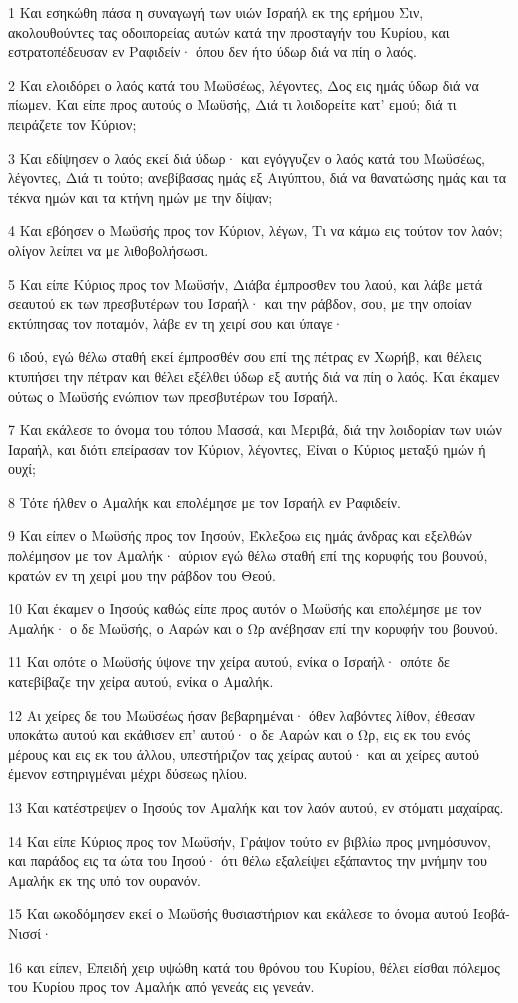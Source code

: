 \par 1 Και εσηκώθη πάσα η συναγωγή των υιών Ισραήλ εκ της ερήμου Σιν, ακολουθούντες τας οδοιπορείας αυτών κατά την προσταγήν του Κυρίου, και εστρατοπέδευσαν εν Ραφιδείν· όπου δεν ήτο ύδωρ διά να πίη ο λαός.
\par 2 Και ελοιδόρει ο λαός κατά του Μωϋσέως, λέγοντες, Δος εις ημάς ύδωρ διά να πίωμεν. Και είπε προς αυτούς ο Μωϋσής, Διά τι λοιδορείτε κατ' εμού; διά τι πειράζετε τον Κύριον;
\par 3 Και εδίψησεν ο λαός εκεί διά ύδωρ· και εγόγγυζεν ο λαός κατά του Μωϋσέως, λέγοντες, Διά τι τούτο; ανεβίβασας ημάς εξ Αιγύπτου, διά να θανατώσης ημάς και τα τέκνα ημών και τα κτήνη ημών με την δίψαν;
\par 4 Και εβόησεν ο Μωϋσής προς τον Κύριον, λέγων, Τι να κάμω εις τούτον τον λαόν; ολίγον λείπει να με λιθοβολήσωσι.
\par 5 Και είπε Κύριος προς τον Μωϋσήν, Διάβα έμπροσθεν του λαού, και λάβε μετά σεαυτού εκ των πρεσβυτέρων του Ισραήλ· και την ράβδον, σου, με την οποίαν εκτύπησας τον ποταμόν, λάβε εν τη χειρί σου και ύπαγε·
\par 6 ιδού, εγώ θέλω σταθή εκεί έμπροσθέν σου επί της πέτρας εν Χωρήβ, και θέλεις κτυπήσει την πέτραν και θέλει εξέλθει ύδωρ εξ αυτής διά να πίη ο λαός. Και έκαμεν ούτως ο Μωϋσής ενώπιον των πρεσβυτέρων του Ισραήλ.
\par 7 Και εκάλεσε το όνομα του τόπου Μασσά, και Μεριβά, διά την λοιδορίαν των υιών Ιαραήλ, και διότι επείρασαν τον Κύριον, λέγοντες, Είναι ο Κύριος μεταξύ ημών ή ουχί;
\par 8 Τότε ήλθεν ο Αμαλήκ και επολέμησε με τον Ισραήλ εν Ραφιδείν.
\par 9 Και είπεν ο Μωϋσής προς τον Ιησούν, Έκλεξοω εις ημάς άνδρας και εξελθών πολέμησον με τον Αμαλήκ· αύριον εγώ θέλω σταθή επί της κορυφής του βουνού, κρατών εν τη χειρί μου την ράβδον του Θεού.
\par 10 Και έκαμεν ο Ιησούς καθώς είπε προς αυτόν ο Μωϋσής και επολέμησε με τον Αμαλήκ· ο δε Μωϋσής, ο Ααρών και ο Ωρ ανέβησαν επί την κορυφήν του βουνού.
\par 11 Και οπότε ο Μωϋσής ύψονε την χείρα αυτού, ενίκα ο Ισραήλ· οπότε δε κατεβίβαζε την χείρα αυτού, ενίκα ο Αμαλήκ.
\par 12 Αι χείρες δε του Μωϋσέως ήσαν βεβαρημέναι· όθεν λαβόντες λίθον, έθεσαν υποκάτω αυτού και εκάθισεν επ' αυτού· ο δε Ααρών και ο Ωρ, εις εκ του ενός μέρους και εις εκ του άλλου, υπεστήριζον τας χείρας αυτού· και αι χείρες αυτού έμενον εστηριγμέναι μέχρι δύσεως ηλίου.
\par 13 Και κατέστρεψεν ο Ιησούς τον Αμαλήκ και τον λαόν αυτού, εν στόματι μαχαίρας.
\par 14 Και είπε Κύριος προς τον Μωϋσήν, Γράψον τούτο εν βιβλίω προς μνημόσυνον, και παράδος εις τα ώτα του Ιησού· ότι θέλω εξαλείψει εξάπαντος την μνήμην του Αμαλήκ εκ της υπό τον ουρανόν.
\par 15 Και ωκοδόμησεν εκεί ο Μωϋσής θυσιαστήριον και εκάλεσε το όνομα αυτού Ιεοβά-Νισσί·
\par 16 και είπεν, Επειδή χειρ υψώθη κατά του θρόνου του Κυρίου, θέλει είσθαι πόλεμος του Κυρίου προς τον Αμαλήκ από γενεάς εις γενεάν.

